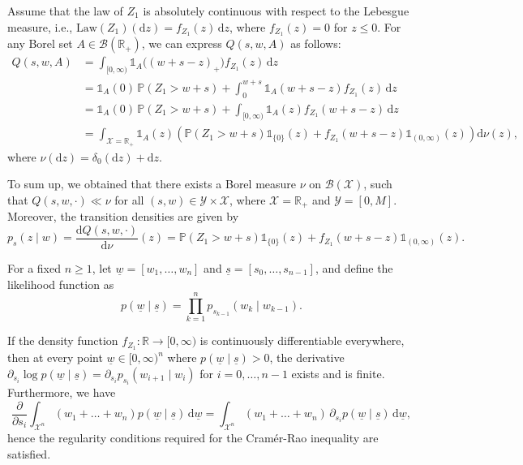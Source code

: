 \documentclass[a4paper,10pt]{article}
\newcommand{\law}[1]{\text{Law}(#1)}
\newcommand{\ind}{\mathds{1}}
\newcommand{\dint}{\mathrm{d}}  %
\newcommand{\ul}[1]{\underline{#1}}
\begin{document}
\smallskip 
Assume that the law of $Z_1$ is absolutely continuous with respect to the Lebesgue measure, i.e., $\law{Z_1}(\dint z)=f_{Z_1}(z)\,\dint z$, where $f_{Z_1}(z) = 0$ for $z \leq 0$. For any Borel set $A \in \mathcal{B}(\mathbb{R}_+)$, we can express $Q(s, w, A)$ as follows:
\begin{align*}
	Q(s,w,A) &= \int_{[0,\infty)} \ind_A\big((w+s-z)_+\big) f_{Z_1}(z)\,\dint z \\
	&= \ind_A(0) \, \mathbb{P}(Z_1 > w + s) + \int_0^{w+s} \ind_A(w+s-z) f_{Z_1}(z)\, \dint z \\
	&= \ind_A(0) \, \mathbb{P}(Z_1 > w + s) + \int_{[0,\infty)} \ind_A(z) f_{Z_1}(w + s - z)\, \dint z \\
	&= \int_{\mathcal{X} = \mathbb{R}_+} \ind_A(z) \left( \mathbb{P}(Z_1 > w + s) \ind_{\{0\}}(z) + f_{Z_1}(w + s - z) \ind_{(0,\infty)}(z) \right) \dint \nu(z),
\end{align*}
where $\nu(\dint z) = \delta_0(\dint z) + \dint z$.

To sum up, we obtained that there exists a Borel measure $\nu$ on $\mathcal{B}(\mathcal{X})$, such that $Q(s, w, \cdot) \ll \nu$ for all $(s, w) \in \mathcal{Y} \times \mathcal{X}$, where $\mathcal{X} = \mathbb{R}_+$ and $\mathcal{Y} = [0, M]$. Moreover, the transition densities are given by
\begin{equation}\label{eq:trans}
	p_s(z \mid w) = \frac{\dint Q(s,w,\cdot)}{\dint \nu}(z) = \mathbb{P}(Z_1 > w + s) \ind_{\{0\}}(z) + f_{Z_1}(w + s - z) \ind_{(0,\infty)}(z).
\end{equation}


For a fixed \( n \geq 1 \), let \( \ul{w} = [w_1, \ldots, w_n] \) and \( \ul{s} = [s_0, \ldots, s_{n-1}] \), and define the likelihood function as
\begin{equation}\label{eq:q:L}
	p(\ul{w} \mid \ul{s}) = \prod_{k=1}^{n} p_{s_{k-1}}(w_k \mid w_{k-1}).
\end{equation}

If the density function \( f_{Z_1}: \mathbb{R} \to [0, \infty) \) is continuously differentiable everywhere, then at every point \( \ul{w} \in [0, \infty)^n \) where \( p(\ul{w} \mid \ul{s}) > 0 \), the derivative \( \partial_{s_i} \log p(\ul{w} \mid \ul{s}) = \partial_{s_i} p_{s_i}(w_{i+1} \mid w_i) \) for \( i = 0, \ldots, n-1 \) exists and is finite. Furthermore, we have
\begin{equation}\label{eq:Q:CR:interchange}
	\frac{\partial}{\partial s_i} \int_{\mathcal{X}^n} (w_1 + \ldots + w_n) p(\ul{w} \mid \ul{s}) \, \dint \ul{w}
	=
	\int_{\mathcal{X}^n} (w_1 + \ldots + w_n) \, \partial_{s_i} p(\ul{w} \mid \ul{s}) \, \dint \ul{w},
\end{equation}
hence the regularity conditions required for the Cram\'er-Rao inequality are satisfied.
\end{document}
